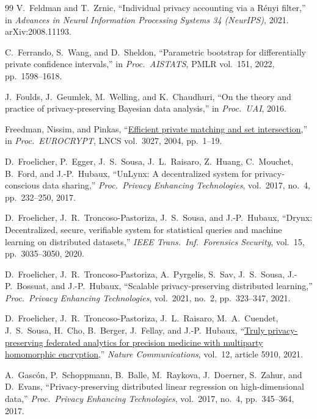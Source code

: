 \documentclass[11pt]{article}
\theoremstyle{definition}
\theoremstyle{plain}
\begin{document}
\begin{thebibliography}{99}
V.~Feldman and T.~Zrnic,
``Individual privacy accounting via a R\'enyi filter,''
in \textit{Advances in Neural Information Processing Systems 34 (NeurIPS)}, 2021. arXiv:2008.11193.

C.~Ferrando, S.~Wang, and D.~Sheldon,
``Parametric bootstrap for differentially private confidence intervals,''
in \textit{Proc.\ AISTATS}, PMLR vol.~151, 2022, pp.\ 1598--1618.

J.~Foulds, J.~Geumlek, M.~Welling, and K.~Chaudhuri,
``On the theory and practice of privacy-preserving Bayesian data analysis,''
in \textit{Proc.\ UAI}, 2016.

Freedman, Nissim, and Pinkas,
``\href{https://doi.org/10.1007/978-3-540-24676-3_1}{Efficient private matching and set intersection},''
in \textit{Proc.\ EUROCRYPT}, LNCS vol.~3027, 2004, pp.\ 1--19.

D.~Froelicher, P.~Egger, J.~S.~Sousa, J.~L.~Raisaro, Z.~Huang, C.~Mouchet, B.~Ford, and J.-P.~Hubaux,
``UnLynx: A decentralized system for privacy-conscious data sharing,''
\textit{Proc.\ Privacy Enhancing Technologies}, vol.~2017, no.~4, pp.\ 232--250, 2017.

D.~Froelicher, J.~R.~Troncoso-Pastoriza, J.~S.~Sousa, and J.-P.~Hubaux,
``Drynx: Decentralized, secure, verifiable system for statistical queries and machine learning on distributed datasets,''
\textit{IEEE Trans.\ Inf.\ Forensics Security}, vol.~15, pp.\ 3035--3050, 2020.

D.~Froelicher, J.~R.~Troncoso-Pastoriza, A.~Pyrgelis, S.~Sav, J.~S.~Sousa, J.-P.~Bossuat, and J.-P.~Hubaux,
``Scalable privacy-preserving distributed learning,''
\textit{Proc.\ Privacy Enhancing Technologies}, vol.~2021, no.~2, pp.\ 323--347, 2021.

D.~Froelicher, J.~R.~Troncoso-Pastoriza, J.~L.~Raisaro, M.~A.~Cuendet, J.~S.~Sousa, H.~Cho, B.~Berger, J.~Fellay, and J.-P.~Hubaux,
``\href{https://doi.org/10.1038/s41467-021-25972-y}{Truly privacy-preserving federated analytics for precision medicine with multiparty homomorphic encryption},''
\textit{Nature Communications}, vol.~12, article 5910, 2021.

A.~Gasc\'on, P.~Schoppmann, B.~Balle, M.~Raykova, J.~Doerner, S.~Zahur, and D.~Evans,
``Privacy-preserving distributed linear regression on high-dimensional data,''
\textit{Proc.\ Privacy Enhancing Technologies}, vol.~2017, no.~4, pp.\ 345--364, 2017.


\end{thebibliography}
\end{document}
